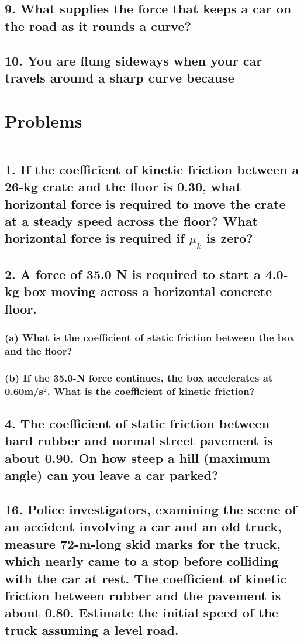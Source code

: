 \documentclass[12pt,a4paper,english]{article}
\begin{document}
\begin{flushleft}
  \subsection{9. What supplies the force that keeps a car on the road as it rounds a curve?}
  \subsection{10. You are flung sideways when your car travels around a sharp curve because }
  \section*{Problems}
  \hrule
  \subsection{1. If the coefficient of kinetic friction between a 26-kg crate and the floor is 0.30, what horizontal force is required to move the crate at a steady speed across the floor? What horizontal force is required if $\mu_k$ is zero?}
  \subsection{2. A force of 35.0 N is required to start a 4.0-kg box moving across a horizontal concrete floor.}
  \subsubsection{(a) What is the coefficient of static friction between the box and the floor?}
  \subsubsection{(b) If the 35.0-N force continues, the box accelerates at 0.60m/s$^2$. What is the coefficient of kinetic friction?}
  \subsection{4. The coefficient of static friction between hard rubber and normal street pavement is about 0.90. On how steep a hill (maximum angle) can you leave a car parked?}
  \subsection{16. Police investigators, examining the scene of an accident involving a car and an old truck, measure 72-m-long skid marks for the truck, which nearly came to a stop before colliding with the car at rest. The coefficient of kinetic friction between rubber and the pavement is about 0.80. Estimate the initial speed of the truck assuming a level road.}

\end{flushleft}
\end{document}
